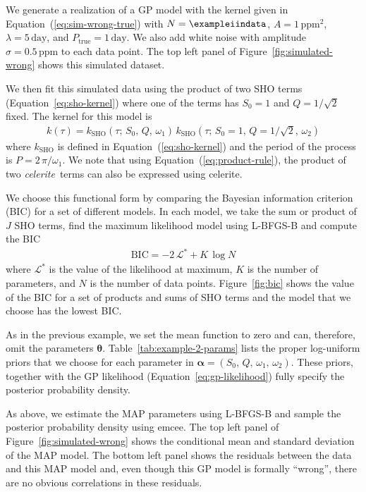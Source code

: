\documentclass[manuscript, letterpaper]{aastex6}
\newcommand{\project}[1]{\textsf{#1}}
\newcommand{\celerite}{\project{celerite}}
\newcommand{\celeriteterm}{\emph{celerite}}
\newcommand{\emcee}{\project{emcee}}
\newcommand{\figureref}[1]{\ref{fig:#1}}
\newcommand{\Figure}[1]{Figure~\figureref{#1}}
\renewcommand{\eqref}[1]{\ref{eq:#1}}
\newcommand{\Eq}[1]{Equation~(\eqref{#1})}
\newcommand{\eq}[1]{\Eq{#1}}
\newcommand{\eqalt}[1]{Equation~\eqref{#1}}
\newcommand{\bvec}[1]{{\ensuremath{\boldsymbol{#1}}}}
\newcommand{\response}[1]{{#1}}
\begin{document}
\response{We generate a realization of a GP model with the kernel given in
    \eq{sim-wrong-true} with $N = \exampleiindata$, $A = 1\,\mathrm{ppm}^2$,
    $\lambda = 5\,\mathrm{day}$, and $P_\mathrm{true} = 1\,\mathrm{day}$.
    We also add white noise with amplitude $\sigma = 0.5\,\mathrm{ppm}$ to each
    data point.
    The top left panel of \Figure{simulated-wrong} shows this simulated dataset.

    We then fit this simulated data using the product of two SHO terms
    (\eqalt{sho-kernel}) where one of the terms has $S_0 = 1$ and $Q =
        1/\sqrt{2}$ fixed.
    The kernel for this model is
    \begin{eqnarray}
        k(\tau) = k_\mathrm{SHO}(\tau;\,S_0,\,Q,\,\omega_1) \,
        k_\mathrm{SHO}(\tau;\,S_0 = 1,\,Q = 1/\sqrt{2},\,\omega_2)
    \end{eqnarray}
    where $k_\mathrm{SHO}$ is defined in \eq{sho-kernel} and the period of the
    process is $P=2\,\pi/\omega_1$.
    We note that using \eq{product-rule}, the product of two \celeriteterm\ terms
    can also be expressed using \celerite.

    We choose this functional form by comparing the Bayesian information criterion
    (BIC) for a set of different models.
    In each model, we take the sum or product of $J$ SHO terms, find the maximum
    likelihood model using \project{L-BFGS-B} and compute the BIC
    \citep{Schwarz:1978}
    \begin{eqnarray}
        \mathrm{BIC} = -2\,\mathcal{L}^* + K\,\log N
    \end{eqnarray}
    where $\mathcal{L}^*$ is the value of the likelihood at maximum, $K$ is the
    number of parameters, and $N$ is the number of data points.
    \Figure{bic} shows the value of the BIC for a set of products and sums of SHO
    terms and the model that we choose has the lowest BIC.

    As in the previous example, we set the mean function to zero and can,
    therefore, omit the parameters $\bvec{\theta}$.
    Table~\ref{tab:example-2-params} lists the proper log-uniform priors that we
    choose for each parameter in $\bvec{\alpha} =
        (S_0,\,Q,\,\omega_1,\,\omega_2)$.
    These priors, together with the GP likelihood (\eqalt{gp-likelihood}) fully
    specify the posterior probability density.

    As above, we estimate the MAP parameters using \project{L-BFGS-B} and sample
    the posterior probability density using \emcee.
    The top left panel of \Figure{simulated-wrong} shows the conditional mean and
    standard deviation of the MAP model.
    The bottom left panel shows the residuals between the data and this MAP model
    and, even though this GP model is formally ``wrong'', there are no obvious
    correlations in these residuals.

}
\end{document}
